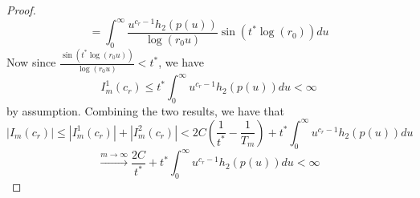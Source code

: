\documentclass[10pt,a4paper]{amsart}
\newcommand{\tti}{\rightarrow\infty}
\begin{document}
\begin{proof}
    \begin{equation}
        = \int_0^{\infty}\frac{u^{c_r-1}h_2(p(u))}{\log(r_0u)} \sin(t^*\log (r_0))du
    \end{equation}
    Now since $\frac{\sin(t^*\log(r_0u))}{\log(r_0u)} < t^*$, we have
    \begin{equation}
        I_m^1(c_r) \leq {t^*} \int_{0}^{\infty} u^{c_r-1}h_2(p(u))du < \infty
    \end{equation}
    by assumption. Combining the two results, we have that
    \begin{equation}
        |I_m(c_r)| \leq |I_m^1(c_r)| + |I_m^2(c_r)| < 2C\left(\frac{1}{t^*} - \frac{1}{T_m}\right) + t^*\int_0^{\infty}u^{c_r-1}h_2(p(u))du
    \end{equation}
    \begin{equation}
        \overset{m\tti}{\to}\frac{2C}{t^*}+{t^*}\int_0^{\infty}u^{c_r-1}h_2(p(u))du < \infty
    \end{equation}
\end{proof}
\end{document}
